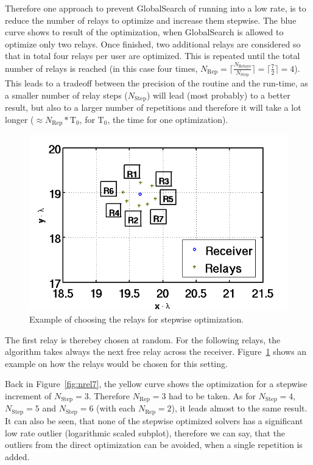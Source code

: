 Therefore one approach to prevent GlobalSearch of running into a low rate, is to reduce the number of relays to optimize and increase them stepwise.
The blue curve shows to result of the optimization, when GlobalSearch is allowed to optimize only two relays.
Once finished, two additional relays are considered so that in total four relays per user are optimized.
This is repeated until the total number of relays is reached (in this case four times, $N_{\text{Rep}} = \lceil\frac{N_{\text{Relays}}}{N_{\text{Step}}}\rceil = \lceil\frac{7}{2}\rceil=4$).
This leads to a tradeoff between the precision of the routine and the run-time, as a smaller number of relay steps ($ N_{\text{Step}}$) will lead (most probably) to a better result, but also to a larger number of repetitions and therefore it will take a lot longer ($\approx N_{\text{Rep}}*\text{T}_0$, for $\text{T}_0$, the time for one optimization).

\begin{figure}[h]
\centering
  \includegraphics[width=0.6\linewidth]{images/choice_of_relays.png}
\caption{Example of choosing the relays for stepwise optimization.}
\label{fig:rel_choice}
\end{figure}

The first relay is therebey chosen at random.
For the following relays, the algorithm takes always the next free relay across the receiver.
Figure~\ref{fig:rel_choice} shows an example on how the relays would be chosen for this setting.

Back in Figure~\ref{fig:nrel7}, the yellow curve shows the optimization for a stepwise increment of $N_{\text{Step}}=3$.
Therefore $N_{\text{Rep}} = 3$ had to be taken.
As for $N_{\text{Step}}=4$, $N_{\text{Step}}=5$ and $N_{\text{Step}}=6$ (with each $N_{\text{Rep}} = 2$), it leads almost to the same result.
It can also be seen, that none of the stepwise optimized solvers has a significant low rate outlier (logarithmic scaled subplot), therefore we can say, that the outliers from the direct optimization can be avoided, when a single repetition is added.






